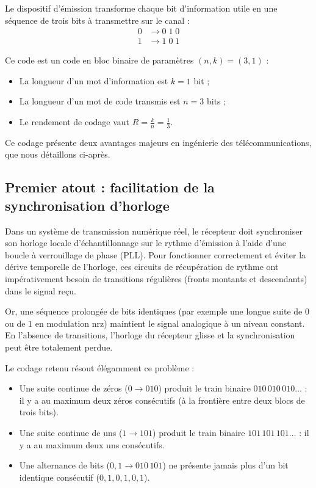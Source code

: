 \documentclass[a4paper,12pt]{report}
\begin{document}
Le dispositif d'émission transforme chaque bit d'information utile en une séquence de trois bits à transmettre sur le canal :
\begin{align*}
    0 &\longrightarrow 0\;1\;0 \\
    1 &\longrightarrow 1\;0\;1
\end{align*}

Ce code est un code en bloc binaire de paramètres $(n, k) = (3, 1)$ :
\begin{itemize}
    \item La longueur d'un mot d'information est $k = 1$ bit ;
    \item La longueur d'un mot de code transmis est $n = 3$ bits ;
    \item Le rendement de codage vaut $R = \frac{k}{n} = \frac{1}{3}$.
\end{itemize}

Ce codage présente deux avantages majeurs en ingénierie des télécommunications, que nous détaillons ci-après.

\subsection{Premier atout : facilitation de la synchronisation d'horloge}

Dans un système de transmission numérique réel, le récepteur doit synchroniser son horloge locale d'échantillonnage sur le rythme d'émission à l'aide d'une boucle à verrouillage de phase (PLL). Pour fonctionner correctement et éviter la dérive temporelle de l'horloge, ces circuits de récupération de rythme ont impérativement besoin de transitions régulières (fronts montants et descendants) dans le signal reçu. 

Or, une séquence prolongée de bits identiques (par exemple une longue suite de $0$ ou de $1$ en modulation \gls{nrz}) maintient le signal analogique à un niveau constant. En l'absence de transitions, l'horloge du récepteur glisse et la synchronisation peut être totalement perdue.

Le codage retenu résout élégamment ce problème :
\begin{itemize}
    \item Une suite continue de zéros ($0 \to 010$) produit le train binaire $010\,010\,010\dots$ : il y a au maximum deux zéros consécutifs (à la frontière entre deux blocs de trois bits).
    \item Une suite continue de uns ($1 \to 101$) produit le train binaire $101\,101\,101\dots$ : il y a au maximum deux uns consécutifs.
    \item Une alternance de bits ($0, 1 \to 010\,101$) ne présente jamais plus d'un bit identique consécutif ($0, 1, 0, 1, 0, 1$).
\end{itemize}
\end{document}
